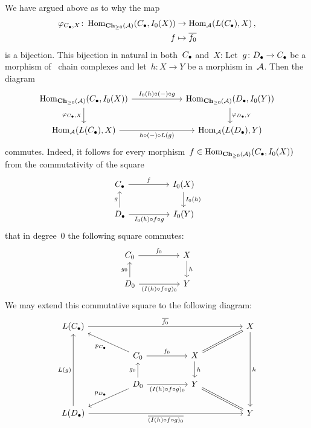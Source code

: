 We have argued above as to why the map
\begin{align*}
  \varphi_{C_\bullet,X}
  \colon
  \operatorname{Hom}_{\mathbf{Ch}_{\geq 0}(\mathcal{A})}(C_\bullet, I_0(X))
  &\to
  \operatorname{Hom}_{\mathcal{A}}(L(C_\bullet), X)  \,,
  \\
  f
  &\mapsto
  \overline{f_0}
\end{align*}
is a bijection.
This bijection in natural in both~$C_\bullet$ and~$X$:
Let~$g \colon D_\bullet \to C_\bullet$ be a morphism of~ chain complexes and let~$h \colon X \to Y$ be a morphism in~$\mathcal{A}$.
Then the diagram
\begin{equation}
  \label{equation: naturality square}
  \begin{tikzcd}[column sep = 6em]
      \Hom_{\Chh_{\geq 0}(\Acat)}(\Ccc, I_0(X))
      \arrow{r}[above]{I_0(h) \circ (-) \circ g}
      \arrow{d}[left]{\varphi_{\Ccc,X}}
    & \Hom_{\Chh_{\geq 0}(\Acat)}(\Dcc, I_0(Y))
      \arrow{d}[right]{\varphi_{\Dcc,Y}}
    \\
      \Hom_{\Acat}(L(\Ccc), X)
      \arrow{r}[below]{h \circ (-) \circ L(g)}
    & \Hom_{\Acat}(L(\Dcc), Y)
  \end{tikzcd}
\end{equation}
commutes.
Indeed, it follows for every morphism~$f \in \operatorname{Hom}_{\mathbf{Ch}_{\geq 0}(\mathcal{A})}(C_\bullet, I_0(X))$ from the commutativity of the square
\[
  \begin{tikzcd}[column sep = huge]
      \Ccc
      \arrow{r}[above]{f}
    & I_0(X)
      \arrow{d}[right]{I_0(h)}
    \\
      \Dcc
      \arrow{u}[left]{g}
      \arrow{r}[below]{I_0(h) \circ f \circ g}
    & I_0(Y)
  \end{tikzcd}
\]
that in degree~$0$ the following square commutes:
\[
  \begin{tikzcd}[column sep = huge]
      C_0
      \arrow{r}[above]{f_0}
    & X
      \arrow{d}[right]{h}
    \\
      D_0
      \arrow{u}[left]{g_0}
      \arrow{r}[below]{(I(h) \circ f \circ g)_0}
    & Y
  \end{tikzcd}
\]
We may extend this commutative square to the following diagram:
\[
  \begin{tikzcd}[column sep = huge]
      L(\Ccc)
      \arrow{rrr}[above]{\induced{f_0}}
    & {}
    & {}
    & X
      \arrow{ddd}[right]{h}
    \\
      {}
    & C_0
      \arrow{ul}[below left]{p_{\Ccc}}
      \arrow{r}[above]{f_0}
    & X
      \arrow[equal]{ur}
      \arrow{d}[right]{h}
    & {}
    \\
      {}
    & D_0
      \arrow{dl}[above left]{p_{\Dcc}}
      \arrow{u}[left]{g_0}
      \arrow{r}[below]{(I(h) \circ f \circ g)_0}
    & Y
      \arrow[equal]{dr}
    & {}
    \\
      L(\Dcc)
      \arrow{uuu}[left]{L(g)}
      \arrow{rrr}[below]{\induced{(I(h) \circ f \circ g)_0}}
    & {}
    & {}
    & Y
  \end{tikzcd}
\]
